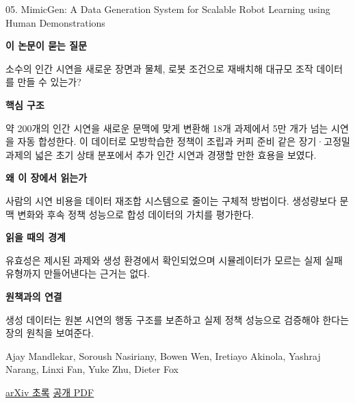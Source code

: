 \documentclass[11pt,openany]{book}
\begin{document}
\begin{termcard}{05. MimicGen: A Data Generation System for Scalable Robot Learning using Human Demonstrations}

\par

\medskip

{\sffamily\bfseries\color{deepblue} 이 논문이 묻는 질문}\par

소수의 인간 시연을 새로운 장면과 물체, 로봇 조건으로 재배치해 대규모 조작 데이터를 만들 수 있는가?

\smallskip

{\sffamily\bfseries\color{deepblue} 핵심 구조}\par

약 200개의 인간 시연을 새로운 문맥에 맞게 변환해 18개 과제에서 5만 개가 넘는 시연을 자동 합성한다. 이 데이터로 모방학습한 정책이 조립과 커피 준비 같은 장기·고정밀 과제의 넓은 초기 상태 분포에서 추가 인간 시연과 경쟁할 만한 효용을 보였다.

\smallskip

{\sffamily\bfseries\color{deepblue} 왜 이 장에서 읽는가}\par

사람의 시연 비용을 데이터 재조합 시스템으로 줄이는 구체적 방법이다. 생성량보다 문맥 변화와 후속 정책 성능으로 합성 데이터의 가치를 평가한다.

\smallskip

{\sffamily\bfseries\color{coral} 읽을 때의 경계}\par

유효성은 제시된 과제와 생성 환경에서 확인되었으며 시뮬레이터가 모르는 실제 실패 유형까지 만들어낸다는 근거는 없다.

\smallskip

{\sffamily\bfseries\color{teal} 원책과의 연결}\par

생성 데이터는 원본 시연의 행동 구조를 보존하고 실제 정책 성능으로 검증해야 한다는 장의 원칙을 보여준다.

\medskip

{\footnotesize\color{muted} Ajay Mandlekar, Soroush Nasiriany, Bowen Wen, Iretiayo Akinola, Yashraj Narang, Linxi Fan, Yuke Zhu, Dieter Fox\par

\href{https://arxiv.org/abs/2310.17596}{arXiv 초록} \quad \href{https://arxiv.org/pdf/2310.17596}{공개 PDF}\par}

\end{termcard}
\end{document}
